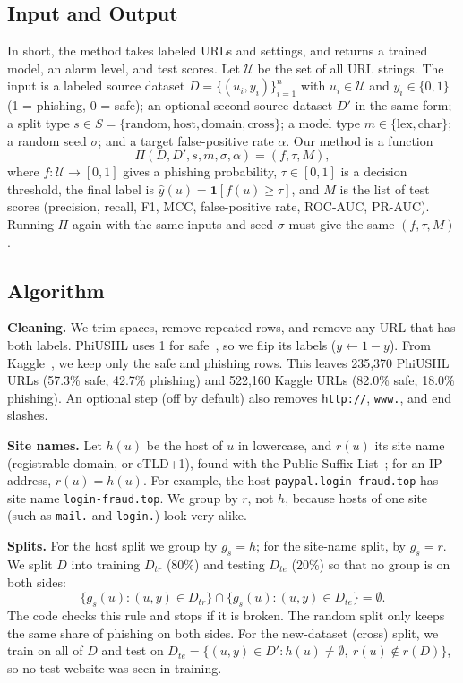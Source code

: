 \documentclass[sigconf,nonacm]{acmart}
\begin{document}
\subsection{Input and Output}
In short, the method takes labeled URLs and settings, and returns a trained model, an alarm level, and test scores. Let $\mathcal{U}$ be the set of all URL strings. The input is a labeled source dataset $D=\{(u_i,y_i)\}_{i=1}^{n}$ with $u_i\in\mathcal{U}$ and $y_i\in\{0,1\}$ (1 = phishing, 0 = safe); an optional second-source dataset $D'$ in the same form; a split type $s\in S=\{\text{random},\text{host},\text{domain},\text{cross}\}$; a model type $m\in\{\text{lex},\text{char}\}$; a random seed $\sigma$; and a target false-positive rate $\alpha$. Our method is a function
\[
\Pi(D,D',s,m,\sigma,\alpha)=(f,\tau,M),
\]
where $f:\mathcal{U}\rightarrow[0,1]$ gives a phishing probability, $\tau\in[0,1]$ is a decision threshold, the final label is $\hat{y}(u)=\mathbf{1}[f(u)\ge\tau]$, and $M$ is the list of test scores (precision, recall, F1, MCC, false-positive rate, ROC-AUC, PR-AUC). Running $\Pi$ again with the same inputs and seed $\sigma$ must give the same $(f,\tau,M)$.

\subsection{Algorithm}
\textbf{Cleaning.} We trim spaces, remove repeated rows, and remove any URL that has both labels. PhiUSIIL uses 1 for safe~\cite{phius}, so we flip its labels ($y\leftarrow1-y$). From Kaggle~\cite{kaggle}, we keep only the safe and phishing rows. This leaves 235,370 PhiUSIIL URLs (57.3\% safe, 42.7\% phishing) and 522,160 Kaggle URLs (82.0\% safe, 18.0\% phishing). An optional step (off by default) also removes \texttt{http://}, \texttt{www.}, and end slashes.

\textbf{Site names.} Let $h(u)$ be the host of $u$ in lowercase, and $r(u)$ its site name (registrable domain, or eTLD+1), found with the Public Suffix List~\cite{psl}; for an IP address, $r(u)=h(u)$. For example, the host \texttt{paypal.login-fraud.top} has site name \texttt{login-fraud.top}. We group by $r$, not $h$, because hosts of one site (such as \texttt{mail.} and \texttt{login.}) look very alike.

\textbf{Splits.} For the host split we group by $g_s=h$; for the site-name split, by $g_s=r$. We split $D$ into training $D_{tr}$ (80\%) and testing $D_{te}$ (20\%) so that no group is on both sides:
\[
\{g_s(u):(u,y)\in D_{tr}\}\cap\{g_s(u):(u,y)\in D_{te}\}=\emptyset.
\]
The code checks this rule and stops if it is broken. The random split only keeps the same share of phishing on both sides. For the new-dataset (cross) split, we train on all of $D$ and test on
$D_{te}=\{(u,y)\in D' : h(u)\neq\emptyset,\ r(u)\notin r(D)\}$, so no test website was seen in training.
\end{document}
